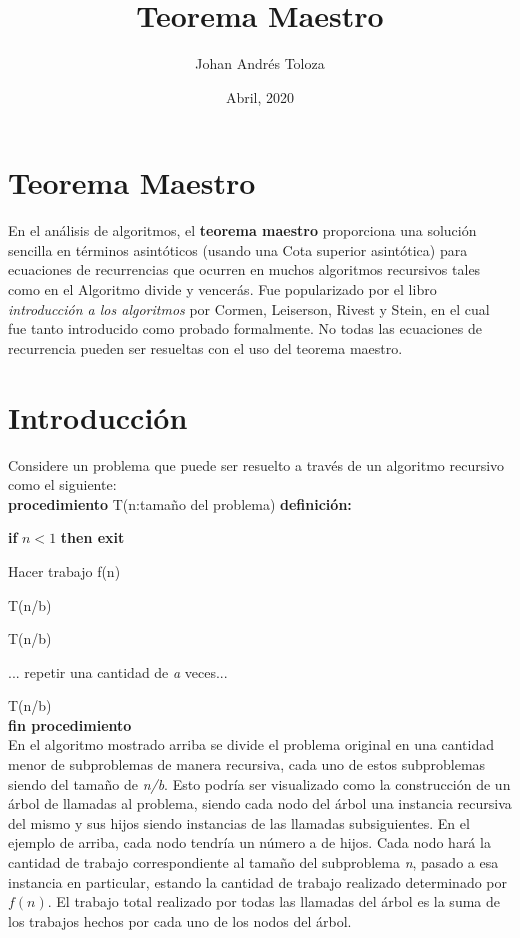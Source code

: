 \documentclass[12pt, letterpaper]{article} %
\title{Teorema Maestro}
\author{Johan Andrés Toloza}
\date{Abril, 2020}
\begin{document}
\maketitle
\section*{Teorema Maestro} \hline
En el análisis de algoritmos, el \textbf{teorema maestro} proporciona una solución sencilla en términos asintóticos (usando una Cota superior asintótica) para ecuaciones de recurrencias que ocurren en muchos algoritmos recursivos tales como en el Algoritmo divide y vencerás. Fue popularizado por el libro \textit{introducción a los algoritmos} por Cormen, Leiserson, Rivest y Stein, en el cual fue tanto introducido como probado formalmente. No todas las ecuaciones de recurrencia pueden ser resueltas con el uso del teorema maestro.

\tableofcontents

\section{Introducción}
Considere un problema que puede ser resuelto a través de un algoritmo recursivo como el siguiente:\\

\vspace{1mm}
\textbf{procedimiento} T(n:tamaño del problema) \textbf{definición:}
    \par\hspace{4mm}\textbf{if} $n<1$ \textbf{then exit}
    \par\hspace{4mm} Hacer trabajo f(n)
    \vspace{3mm}
    \par\hspace{4mm} T(n/b)
    \par\hspace{4mm} T(n/b)
    \par\hspace{4mm} ... repetir una cantidad de \textit{a} veces...
    \par\hspace{4mm} T(n/b)\\
    \textbf{fin procedimiento}\\

En el algoritmo mostrado arriba se divide el problema original en una cantidad menor de subproblemas de manera recursiva, cada uno de estos subproblemas siendo del tamaño de \textit{n/b}. Esto podría ser visualizado como la construcción de un árbol de llamadas al problema, siendo cada nodo del árbol una instancia recursiva del mismo y sus hijos siendo instancias de las llamadas subsiguientes. En el ejemplo de arriba, cada nodo tendría un número a de hijos. Cada nodo hará la cantidad de trabajo correspondiente al tamaño del subproblema \textit{n}, pasado a esa instancia en particular, estando la cantidad de trabajo realizado determinado por $f(n)$. El trabajo total realizado por todas las llamadas del árbol es la suma de los trabajos hechos por cada uno de los nodos del árbol. \\
\vspace{1mm}
\end{document}
